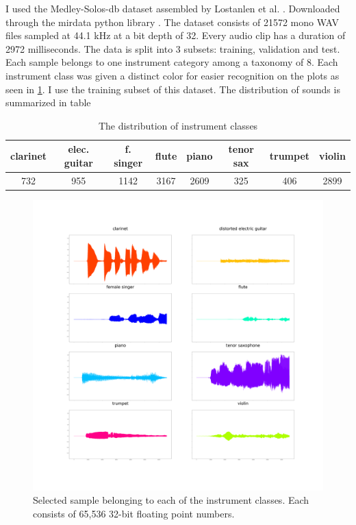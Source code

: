 \documentclass[11pt]{article}
\begin{document}
I used the Medley-Solos-db dataset assembled by Lostanlen et al. \cite{medley}. Downloaded through the mirdata python library \cite{bittner_fuentes_2019}. The dataset consists of 21572 mono WAV files sampled at 44.1 kHz at a bit depth of 32. Every audio clip has a duration of 2972 milliseconds. The data is split into 3 subsets: training, validation and test. Each sample belongs to one instrument category among a taxonomy of 8. Each instrument class was given a distinct color for easier recognition on the plots as seen in \ref{fig:8-plots}. I use the training subset of this dataset. The distribution of sounds is summarized in table \

\begin{table}[h!]
\centering
\begin{tabular}{ |c|c|c|c|c|c|c|c| }
\hline
clarinet & elec. guitar & f. singer & flute & piano & tenor sax & trumpet & violin \\
\hline
732 & 955 & 1142 & 3167 & 2609 & 325 & 406 & 2899 \\
\hline
\end{tabular}
\caption{\label{table:distr_of_sounds}The distribution of instrument classes}
\end{table}

\begin{figure}[h!]
\centering
\includegraphics[width=.9\linewidth]{./Figures/8_samples.png}
\caption{Selected sample belonging to each of the instrument classes. Each consists of 65,536 32-bit floating point numbers.}
\label{fig:8-plots}
\end{figure}
\end{document}
